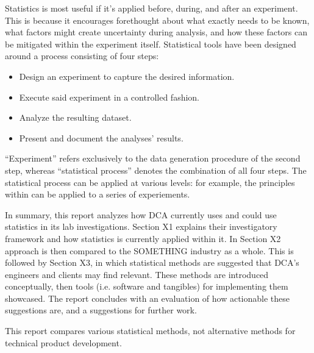 \documentclass[11pt,a4paper,article]{memoir} %
\begin{document}
\par
Statistics is most useful if it's applied before, during, and after an experiment. This is because it encourages forethought about what exactly needs to be known, what factors might create uncertainty during analysis, and how these factors can be mitigated within the experiment itself. Statistical tools have been designed around a process consisting of four steps:
\begin{itemize}
\item Design an experiment to capture the desired information.
\item Execute said experiment in a controlled fashion.
\item Analyze the resulting dataset.
\item Present and document the analyses' results.
\end{itemize}
``Experiment'' refers exclusively to the data generation procedure of the second step, whereas ``statistical process'' denotes the combination of all four steps.
The statistical process can be applied at various levels: for example, the principles within can be applied to a series of experiements.
\par
In summary, this report analyzes how DCA currently uses and could use statistics in its lab investigations. Section X1 explains their investigatory framework and how statistics is currently applied within it. In Section X2 approach is then compared to the SOMETHING industry as a whole. This is followed by Section X3, in which statistical methods are suggested that DCA's engineers and clients may find relevant. These methods are introduced conceptually, then tools (i.e. software and tangibles) for implementing them showcased. The report concludes with an evaluation of how actionable these suggestions are, and a suggestions for further work.
\par
This report compares various statistical methods, not alternative methods for technical product development.






\end{document}
